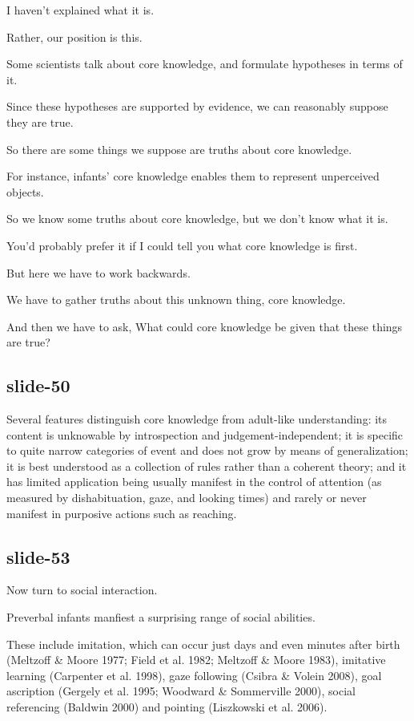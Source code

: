 \documentclass[12pt,\papersize]{extarticle}
\begin{document}
I haven't explained what it is.
 
Rather, our position is this.
 
Some scientists talk about core knowledge, and formulate hypotheses in terms of it.
 
Since these hypotheses are supported by evidence, we can reasonably suppose they are true.
 
So there are some things we suppose are truths about core knowledge.
 
For instance, infants' core knowledge enables them to represent unperceived objects.
 
So we know some truths about core knowledge, but we don't know what it is.
 
You'd probably prefer it if I could tell you what core knowledge is first.
 
But here we have to work backwards.
 
We have to gather truths about this unknown thing, core knowledge.
 
And then we have to ask, What could core knowledge be given that these things are true?
 
 
 
\subsection{slide-50}
Several features distinguish core knowledge from adult-like understanding: its content is unknowable by introspection and judgement-independent; it is specific to quite narrow categories of event and does not grow by means of generalization; it is best understood as a collection of rules rather than a coherent theory; and it has limited application being usually manifest in the control of attention (as measured by dishabituation, gaze, and looking times) and rarely or never manifest in purposive actions such as reaching.
 
 
 
\subsection{slide-53}
Now turn to social interaction.
 
Preverbal infants manfiest a surprising range of social abilities.
 
These include imitation, which can occur just days and even minutes after birth (Meltzoff \& Moore 1977; Field et al. 1982; Meltzoff \& Moore 1983), imitative learning (Carpenter et al. 1998), gaze following (Csibra \& Volein 2008), goal ascription (Gergely et al. 1995; Woodward \& Sommerville 2000), social referencing (Baldwin 2000) and pointing (Liszkowski et al. 2006).
 
\end{document}
